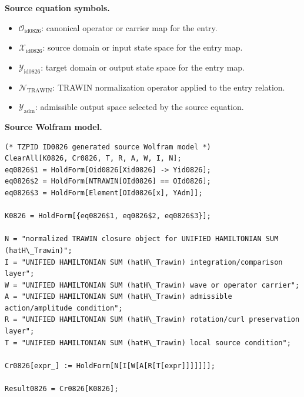 \begin{minipage}[t]{0.49\linewidth}
\begingroup
\small
\raggedright
\textbf{Source equation symbols.}\par
\begin{itemize}[leftmargin=1.35em,itemsep=1pt,topsep=1pt,parsep=0pt]
    \item $\mathcal{O}_{\mathrm{id0826}}$: canonical operator or carrier map for the entry.
    \item $\mathcal{X}_{\mathrm{id0826}}$: source domain or input state space for the entry map.
    \item $\mathcal{Y}_{\mathrm{id0826}}$: target domain or output state space for the entry map.
    \item $\mathcal{N}_{\mathrm{TRAWIN}}$: TRAWIN normalization operator applied to the entry relation.
    \item $\mathcal{Y}_{\mathrm{adm}}$: admissible output space selected by the source equation.
\end{itemize}
\endgroup
\end{minipage}\hfill
\begin{minipage}[t]{0.47\linewidth}
\begingroup
\scriptsize
\raggedright
\textbf{Source Wolfram model.}\par
\begin{Verbatim}[fontsize=\tiny,breaklines=true,breakanywhere=true]
(* TZPID ID0826 generated source Wolfram model *)
ClearAll[K0826, Cr0826, T, R, A, W, I, N];
eq0826$1 = HoldForm[Oid0826[Xid0826] -> Yid0826];
eq0826$2 = HoldForm[NTRAWIN[OId0826] == OId0826];
eq0826$3 = HoldForm[Element[OId0826[x], YAdm]];

K0826 = HoldForm[{eq0826$1, eq0826$2, eq0826$3}];

N = "normalized TRAWIN closure object for UNIFIED HAMILTONIAN SUM (hatH\_Trawin)";
I = "UNIFIED HAMILTONIAN SUM (hatH\_Trawin) integration/comparison layer";
W = "UNIFIED HAMILTONIAN SUM (hatH\_Trawin) wave or operator carrier";
A = "UNIFIED HAMILTONIAN SUM (hatH\_Trawin) admissible action/amplitude condition";
R = "UNIFIED HAMILTONIAN SUM (hatH\_Trawin) rotation/curl preservation layer";
T = "UNIFIED HAMILTONIAN SUM (hatH\_Trawin) local source condition";

Cr0826[expr_] := HoldForm[N[I[W[A[R[T[expr]]]]]]];

Result0826 = Cr0826[K0826];
\end{Verbatim}
\endgroup
\end{minipage}

